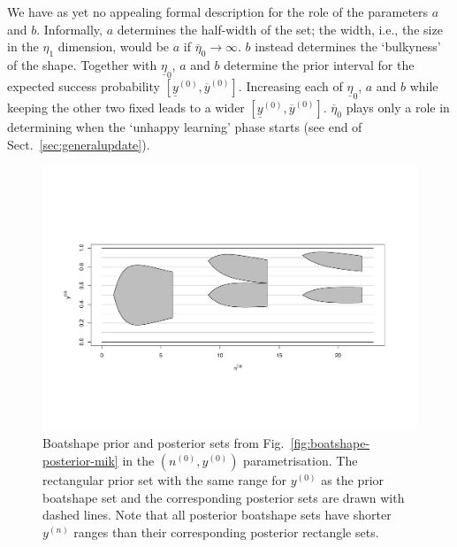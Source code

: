 \documentclass[runningheads,a4paper]{llncs}
\newcommand{\uz}{^{(0)}} %
\newcommand{\un}{^{(n)}} %
\newcommand{\ul}[1]{\underline{#1}}
\newcommand{\ol}[1]{\overline{#1}}
\def\yz{y\uz}
\def\yn{y\un}
\def\yzl{\ul{y}\uz}
\def\yzu{\ol{y}\uz}
\def\nz{n\uz}
\def\ezl{\ul{\eta}_0}
\def\ezu{\ol{\eta}_0}
\begin{document}
We have as yet no appealing formal description for the role of the parameters $a$ and $b$. %
Informally, $a$ determines the half-width of the set;
the width, i.e., the size in the $\eta_1$ dimension, would be $a$ if $\ezu \to \infty$.
$b$ instead determines the `bulkyness' of the shape.
Together with $\ezl$, $a$ and $b$ determine the prior interval for the expected success probability $[\yzl, \yzu]$.
Increasing each of $\ezl$, $a$ and $b$ while keeping the other two fixed leads to a wider $[\yzl, \yzu]$.
$\ezu$ plays only a role in determining when the `unhappy learning' phase starts
(see end of Sect.~\ref{sec:generalupdate}).
\begin{figure}  %
\centering
\includegraphics[width=\textwidth]{R/boatshape-posterior-normal}%
\caption[Boatshape prior and posterior sets from Fig.~\ref{fig:boatshape-posterior-mik} in the $(\nz,\yz)$ parametrisation.]%
{Boatshape prior and posterior sets from Fig.~\ref{fig:boatshape-posterior-mik} in the $(\nz,\yz)$ parametrisation.
The rectangular prior set with the same range for $\yz$ as the prior boatshape set
and the corresponding posterior sets are drawn with dashed lines. 
Note that all posterior boatshape sets have shorter $\yn$ ranges than their corresponding posterior rectangle sets.}
\label{fig:boatshape-posterior-normal}
\end{figure}
\end{document}
